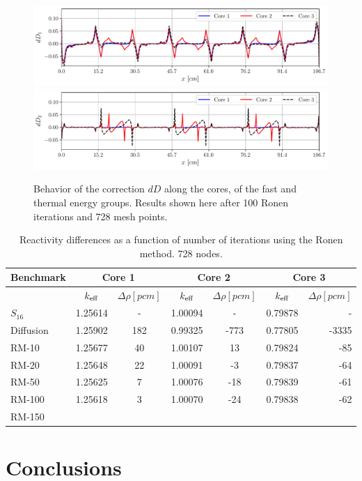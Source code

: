 \begin{figure}[htbp!]
	\centering
	\includegraphics[width=0.48\linewidth]{RM_dD1_100it_8_22_728.pdf}
	\includegraphics[width=0.48\linewidth]{RM_dD2_100it_8_22_728.pdf}
	\caption{Behavior of the correction $dD$ along the cores, of the fast and thermal energy groups. Results shown here after 100 Ronen iterations and 728 mesh points.}
	\label{fig:Dcoef}
\end{figure}


\begin{table}[!htbp]
	\centering
	\caption{Reactivity differences as a function of number of iterations using the Ronen method. 728 nodes.}
	\label{tab:dx_drho}
	\begin{tabular}{lcccccr}
		Benchmark & \multicolumn{2}{c}{Core 1} & \multicolumn{2}{c}{Core 2} & \multicolumn{2}{c}{Core 3}  \\ 
		\midrule
		{}				& ${k_{\textrm{\scriptsize{eff}}}}$& $\Delta\rho [pcm]$& ${k_{\textrm{\scriptsize{eff}}}}$	&$\Delta\rho [pcm]$& ${k_{\textrm{\scriptsize{eff}}}}$	 & $\Delta\rho [pcm]$ \\
		$S_{16}$			&1.25614	&-			 &1.00094   &-				  &0.79878		&-		\\
		Diffusion		&1.25902	&182		 &0.99325	&-773			  &0.77805		&-3335	\\
		RM-10			&1.25677	&40			 &1.00107	&13			 	  &0.79824		&-85	\\
		RM-20			&1.25648	&22			 &1.00091	&-3			  	  &0.79837		&-64	\\
		RM-50			&1.25625	&7			 &1.00076	&-18			  &0.79839		&-61	\\
		RM-100			&1.25618	&3			 &1.00070	&-24			  &0.79838		&-62	\\
		RM-150			&			&			 &			&				  &				&		\\
	\end{tabular}
\end{table}

%
\section{Conclusions}
\label{sec:conc}


